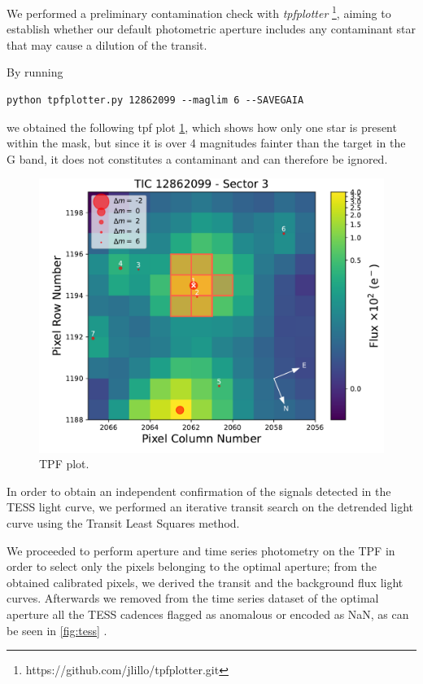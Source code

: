\documentclass[a4paper,11pt,twocolumn]{article}
\begin{document}
We performed a preliminary contamination check with \textit{tpfplotter} \footnote{https://github.com/jlillo/tpfplotter.git}, 
aiming to establish whether our default photometric aperture includes any contaminant star that may cause a dilution of the transit.

By running
\begin{lstlisting}
python tpfplotter.py 12862099 --maglim 6 --SAVEGAIA
\end{lstlisting}
we obtained the following tpf plot \ref{fig:tpfplot}, which shows how only one star is present within the mask, 
but since it is over 4 magnitudes fainter than the target in the G band, it does not constitutes a contaminant and can therefore be ignored.
\begin{figure}
    \centering
    \includegraphics[scale=0.4, angle=0]{../pictures/tess/TPF.pdf}
    \caption{TPF plot.}
    \label{fig:tpfplot}
\end{figure}


In order to obtain an independent confirmation of the signals
detected in the TESS light curve, we performed an iterative transit
search on the detrended light curve using the Transit Least Squares method.



We proceeded to perform aperture and time series photometry on the TPF in order to select only the 
pixels belonging to the optimal aperture; from the obtained calibrated pixels, we derived 
the transit and the background flux light curves. Afterwards we removed from the time series 
dataset of the optimal aperture all the TESS cadences flagged as anomalous or encoded as NaN, 
as can be seen in \ref{fig:tess} .
\end{document}
